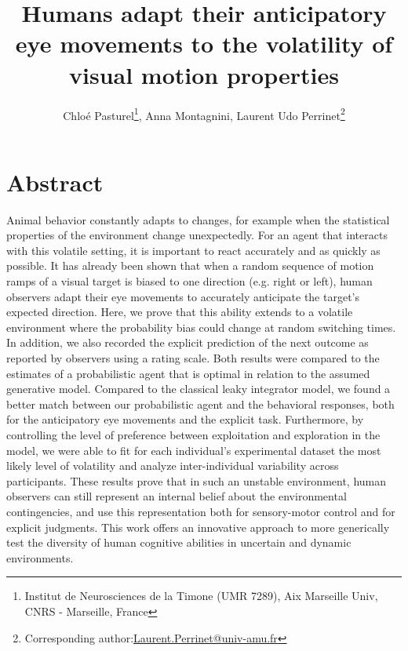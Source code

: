\documentclass[10pt,letterpaper]{article}
\title{Humans adapt their anticipatory eye movements to the volatility of visual motion properties}%
\author{
Chlo\'e Pasturel\thanks{Institut de Neurosciences de la Timone (UMR 7289), Aix Marseille Univ, CNRS - Marseille, France},
Anna Montagnini\footnotemark[1],
Laurent Udo Perrinet\footnotemark[1] \thanks{Corresponding author:\url{Laurent.Perrinet@univ-amu.fr}}
}
\begin{document}
%
\maketitle%
\section*{Abstract}
Animal behavior constantly adapts to changes, for example when the statistical properties of the environment change unexpectedly. For an agent that interacts with this volatile setting, it is important to react accurately and as quickly as possible. It has already been shown that when a random sequence of motion ramps of a visual target is biased to one direction (e.g. right or left), human observers adapt their eye movements to accurately anticipate the target's expected direction. Here, we prove that this ability extends to a volatile environment where the probability bias could change at random switching times. In addition, we also recorded the explicit prediction of the next outcome as reported by observers using a rating scale. Both results were compared to the estimates of a probabilistic agent that is optimal in relation to the assumed generative model. Compared to the classical leaky integrator model, we found a better match between our probabilistic agent and the behavioral responses, both for the anticipatory eye movements and the explicit task. Furthermore, by controlling the level of preference between exploitation and exploration in the model, we were able to fit for each individual's experimental dataset the most likely level of volatility and analyze inter-individual variability across participants. These results prove that in such an unstable environment, human observers can still represent an internal belief about the environmental contingencies, and use this representation both for sensory-motor control and for explicit judgments. This work offers an innovative approach to more generically test the diversity of human cognitive abilities in uncertain and dynamic environments.
\end{document}
